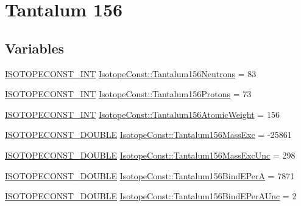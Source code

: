 \hypertarget{group___isotope_const-_tantalum-_ta156}{}\section{Tantalum 156}
\label{group___isotope_const-_tantalum-_ta156}
\subsection*{Variables}
\begin{DoxyCompactItemize}
\item 
\mbox{\hyperlink{group___isotope_const-_macros_ga5f18360b3e99483a35c32d789e62621c}{I\+S\+O\+T\+O\+P\+E\+C\+O\+N\+S\+T\+\_\+\+I\+NT}} \mbox{\hyperlink{group___isotope_const-_tantalum-_ta156_gadbae5e019179cb0f07cc3e8d49a1d9f4}{Isotope\+Const\+::\+Tantalum156\+Neutrons}} = 83
\item 
\mbox{\hyperlink{group___isotope_const-_macros_ga5f18360b3e99483a35c32d789e62621c}{I\+S\+O\+T\+O\+P\+E\+C\+O\+N\+S\+T\+\_\+\+I\+NT}} \mbox{\hyperlink{group___isotope_const-_tantalum-_ta156_ga46a64adf8cbef390dc0018d79a3ed336}{Isotope\+Const\+::\+Tantalum156\+Protons}} = 73
\item 
\mbox{\hyperlink{group___isotope_const-_macros_ga5f18360b3e99483a35c32d789e62621c}{I\+S\+O\+T\+O\+P\+E\+C\+O\+N\+S\+T\+\_\+\+I\+NT}} \mbox{\hyperlink{group___isotope_const-_tantalum-_ta156_ga022e0d3c37767d67386eae5b5e6bc682}{Isotope\+Const\+::\+Tantalum156\+Atomic\+Weight}} = 156
\item 
\mbox{\hyperlink{group___isotope_const-_macros_ga8f45a7272ce02c0b4c65c44636ed719a}{I\+S\+O\+T\+O\+P\+E\+C\+O\+N\+S\+T\+\_\+\+D\+O\+U\+B\+LE}} \mbox{\hyperlink{group___isotope_const-_tantalum-_ta156_ga7ed1a6de8722fe1f77568100dd66b845}{Isotope\+Const\+::\+Tantalum156\+Mass\+Exc}} = -\/25861
\item 
\mbox{\hyperlink{group___isotope_const-_macros_ga8f45a7272ce02c0b4c65c44636ed719a}{I\+S\+O\+T\+O\+P\+E\+C\+O\+N\+S\+T\+\_\+\+D\+O\+U\+B\+LE}} \mbox{\hyperlink{group___isotope_const-_tantalum-_ta156_ga9446c50076dcc039930c7c24bfbd0648}{Isotope\+Const\+::\+Tantalum156\+Mass\+Exc\+Unc}} = 298
\item 
\mbox{\hyperlink{group___isotope_const-_macros_ga8f45a7272ce02c0b4c65c44636ed719a}{I\+S\+O\+T\+O\+P\+E\+C\+O\+N\+S\+T\+\_\+\+D\+O\+U\+B\+LE}} \mbox{\hyperlink{group___isotope_const-_tantalum-_ta156_ga7b5dbf096a41d56af6356f42815cc183}{Isotope\+Const\+::\+Tantalum156\+Bind\+E\+PerA}} = 7871
\item 
\mbox{\hyperlink{group___isotope_const-_macros_ga8f45a7272ce02c0b4c65c44636ed719a}{I\+S\+O\+T\+O\+P\+E\+C\+O\+N\+S\+T\+\_\+\+D\+O\+U\+B\+LE}} \mbox{\hyperlink{group___isotope_const-_tantalum-_ta156_gab5647754e0b2a22f54b7e6056838b253}{Isotope\+Const\+::\+Tantalum156\+Bind\+E\+Per\+A\+Unc}} = 2

\end{DoxyCompactItemize}

